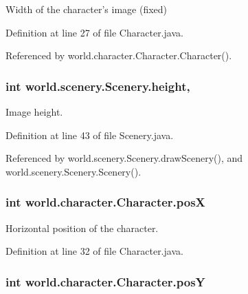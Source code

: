 Width of the character's image (fixed) 



Definition at line 27 of file Character.\-java.



Referenced by world.\-character.\-Character.\-Character().

\hypertarget{a00024_a54b4edfa060087e78a829105bf62a900}{
\subsubsection[{height}]{\setlength{\rightskip}{0pt plus 5cm}int world.\-scenery.\-Scenery.\-height\hspace{0.3cm}{\ttfamily [protected]}, {\ttfamily [inherited]}}}\label{a00024_a54b4edfa060087e78a829105bf62a900}


Image height. 



Definition at line 43 of file Scenery.\-java.



Referenced by world.\-scenery.\-Scenery.\-draw\-Scenery(), and world.\-scenery.\-Scenery.\-Scenery().

\hypertarget{a00005_a78ad3a5c111a39df2ba12b542fa175b4}{
\subsubsection[{pos\-X}]{\setlength{\rightskip}{0pt plus 5cm}int world.\-character.\-Character.\-pos\-X\hspace{0.3cm}{\ttfamily [protected]}}}\label{a00005_a78ad3a5c111a39df2ba12b542fa175b4}


Horizontal position of the character. 



Definition at line 32 of file Character.\-java.

\hypertarget{a00005_a1e81a73a02b73e6f1608ba3c1b6d83ef}{
\subsubsection[{pos\-Y}]{\setlength{\rightskip}{0pt plus 5cm}int world.\-character.\-Character.\-pos\-Y\hspace{0.3cm}{\ttfamily [protected]}}}\label{a00005_a1e81a73a02b73e6f1608ba3c1b6d83ef}


